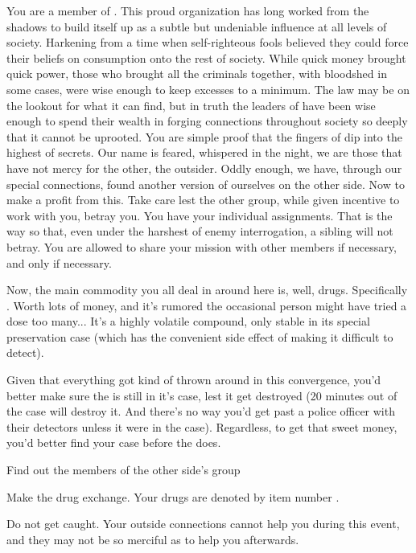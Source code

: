 \documentclass[blue]{guildcamp3}
\begin{document}
\name{\bTechMob{}}


You are a member of \bTechMob{}. This proud organization has long worked from the shadows to build itself up as a subtle but undeniable influence at all levels of \bTechWorld{} society. Harkening from a time when self-righteous fools believed they could force their beliefs on consumption onto the rest of society. While quick money brought quick power, those who brought all the criminals together, with bloodshed in some cases, were wise enough to keep excesses to a minimum. The law may be on the lookout for what it can find, but in truth the leaders of \bTechMob{} have been wise enough to spend their wealth in forging connections throughout society so deeply that it cannot be uprooted. You are simple proof that the fingers of \bTechMob{} dip into the highest of secrets. Our name is feared, whispered in the night, we are those that have not mercy for the other, the outsider. Oddly enough, we have, through our special connections, found another version of ourselves on the other side. Now to make a profit from this. Take care lest the other group, while given incentive to work with you, betray you. You have your individual assignments. That is the way so that, even under the harshest of enemy interrogation, a sibling will not betray. You are allowed to share your mission with other members if necessary, and only if necessary.

Now, the main commodity you all deal in around here is, well, drugs. Specifically \iDrugsTech{}. Worth lots of money, and it's rumored the occasional person might have tried a dose too many... It's a highly volatile compound, only stable in its special preservation case (which has the convenient side effect of making it difficult to detect). 

Given that everything got kind of thrown around in this convergence, you'd better make sure the \iDrugsTech{} is still in it's case, lest it get destroyed (20 minutes out of the case will destroy it. And there's no way you'd get past a police officer with their detectors unless it were in the case). Regardless, to get that sweet money, you'd better find your case before the \bMagicMob{} does. 

\begin{itemz}[Goals]
	\item Find out the members of the other side's group
	\item Make the drug exchange. Your drugs are denoted by item number \iDrugsTech{}.
	\item Do not get caught. Your outside connections cannot help you during this event, and they may not be so merciful as to help you afterwards.
\end{itemz}
\end{document}
